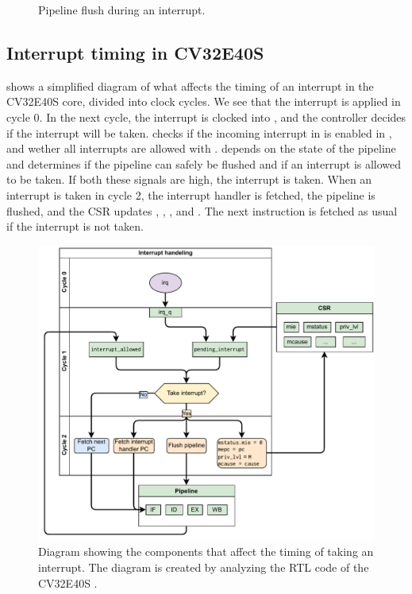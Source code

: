 \begin{figure}[htbp]
\centering

\caption{Pipeline flush during an interrupt.}
\label{fig:interrupt_flush}
\end{figure}



\subsection{Interrupt timing in CV32E40S}

 shows a simplified diagram of what affects the timing of an interrupt in the CV32E40S core, divided into clock cycles. We see that the interrupt is applied in cycle 0. In the next cycle, the interrupt is clocked into , and the controller decides if the interrupt will be taken.  checks if the incoming interrupt in  is enabled in , and wether all interrupts are allowed with .  depends on the state of the pipeline and determines if the pipeline can safely be flushed and if an interrupt is allowed to be taken. 
If both these signals are high, the interrupt is taken. When an interrupt is taken in cycle 2, the interrupt handler is fetched, the pipeline is flushed, and the CSR updates , , , and . The next instruction is fetched as usual if the interrupt is not taken.


\begin{figure}
    \centering
    \includegraphics[width=1\linewidth]{figures/interrupt_handeling_timing.pdf}
    \caption{Diagram showing the components that affect the timing of taking an interrupt. The diagram is created by analyzing the RTL code of the CV32E40S \cite{openhwgroupCv32e40s2024}.}
    \label{fig:interrupt_timing}
\end{figure}






